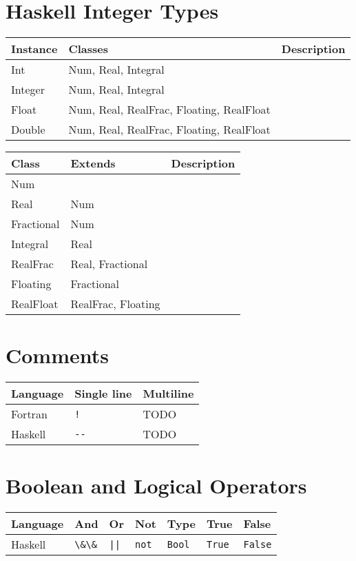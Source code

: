 \documentclass{article}
\begin{document}
\section{Haskell Integer Types}
\begin{longtabu} to 0.75\linewidth { X X X }
	Instance & Classes & Description \\
	\hline
	Int & Num, Real, Integral & \\
	Integer & Num, Real, Integral & \\
	Float & Num, Real, RealFrac, Floating, RealFloat & \\
	Double & Num, Real, RealFrac, Floating, RealFloat & \\
\end{longtabu}
\begin{longtabu} to 0.75\linewidth { X X X }
	Class & Extends & Description \\
	\hline
	Num & & \\
	Real & Num & \\
	Fractional & Num & \\
	Integral & Real & \\
	RealFrac & Real, Fractional & \\
	Floating & Fractional & \\
	RealFloat & RealFrac, Floating & \\
\end{longtabu}

\section{Comments}
\begin{longtabu} to 0.75\linewidth{ X X X }
	Language & Single line & Multiline \\
	\hline
	Fortran & \lstinline$!$ & TODO \\
	Haskell & \lstinline$--$ & TODO \\
\end{longtabu}

\section{Boolean and Logical Operators}
\begin{longtabu} to 0.75\linewidth{ X X X  X X X X }
	Language & And & Or & Not & Type & True & False \\
	\hline
	Haskell & \lstinline$\&\&$ & \lstinline$||$ & \lstinline$not$ & \lstinline$Bool$ & \lstinline$True$ & \lstinline$False$ \\
\end{longtabu}
\end{document}
